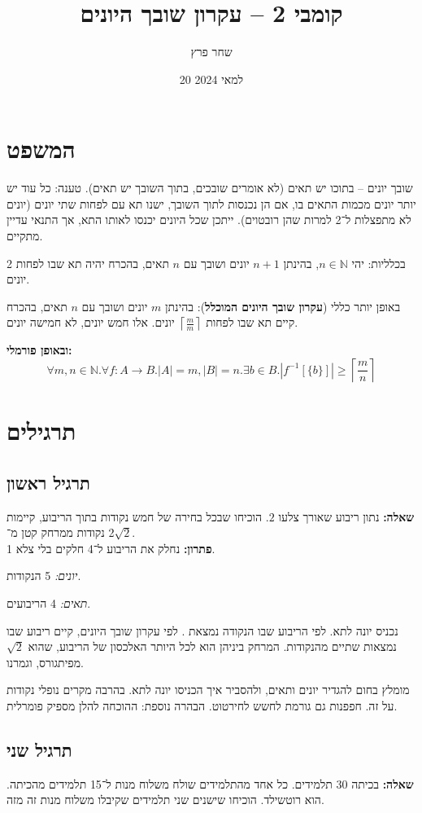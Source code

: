 \documentclass[]{article}
\title{קומבי 2 – עקרון שובך היונים}
\author{שחר פרץ}
\date{20 למאי 2024}
\newcommand\N     {\mathbb{N}}
\newcommand\rc    {\right\rceil}
\newcommand\lc    {\left\lceil}
\newcommand\sof[1]    {\left | #1 \right |}
\newcommand\op    {^{-1}}
\begin{document}
	\maketitle
	
	
	\section{המשפט}
	שובך יונים – בתוכו יש תאים (לא אומרים שובכים, בתוך השובך יש תאים).   טענה: כל עוד יש יותר יונים מכמות התאים בו, אם הן נכנסות לתוך השובך, ישנו תא עם לפחות שתי יונים (יונים לא מתפצלות ל־2 למרות שהן רובטוים). ייתכן שכל היונים יכנסו לאותו התא, אך התנאי עדיין מתקיים. 
	
	בכלליות: יהי $n \in \N$, בהינתן $n + 1 $ יונים ושובך עם $n$ תאים, בהכרח יהיה תא שבו לפחות 2 יונים. 
	
	באופן יותר כללי (\textbf{עקרון שובך היונים המוכלל}): בהינתן $m$ יונים ושובך עם $n$ תאים, בהכרח קיים תא שבו לפחות $\lc \frac{m}{m} \rc$ יונים. אלו חמש יונים, לא חמישה יונים. 
	
	\textbf{ובאופן פורמלי: }
	\[ \forall m, n \in \N. \forall f \colon A \to B. |A| = m, |B| = n. \exists b \in B. \sof{f\op[\{b\}]} \ge \lc \frac{m}{n} \rc \]
	
	\section{תרגילים}
	\subsection{תרגיל ראשון}
	\textbf{שאלה: }נתון ריבוע שאורך צלעו $2$. הוכיחו שבכל בחירה של חמש נקודות בתוך הריבוע, קיימות 2 נקודות ממרחק קטן מ־$\sqrt2 $. \\
	\textbf{פתרון: } נחלק את הריבוע ל־4 חלקים בלי צלא 1. 
	
	\textit{יונים:} 5 הנקודות. 
	
	\textit{תאים: }4 הריבועים.
	
	נכניס יונה לתא. לפי הריבוע שבו הנקודה נמצאת . לפי עקרון שובך היונים, קיים ריבוע שבו נמצאות שתיים מהנקודות. המרחק ביניהן הוא לכל היותר האלכסון של הריבוע, שהוא $\sqrt 2 $ מפיתגורס, וגמרנו. 
	
	מומלץ בחום להגדיר יונים ותאים, ולהסביר איך הכניסו יונה לתא. בהרבה מקרים נופלי נקודות על זה. חפפנות גם גורמת לחשש לחירטוט. הבהרה נוספת: ההוכחה להלן מספיק פומרלית. 
	\subsection{תרגיל שני}
	\textbf{שאלה: }בכיתה $30$ תלמידים. כל אחד מהתלמידים שולח משלוח מנות ל־15 תלמידים מהכיתה. הוא רוטשילד. הוכיחו שישנים שני תלמידים שקיבלו משלוח מנות זה מזה. 
	
\end{document}
